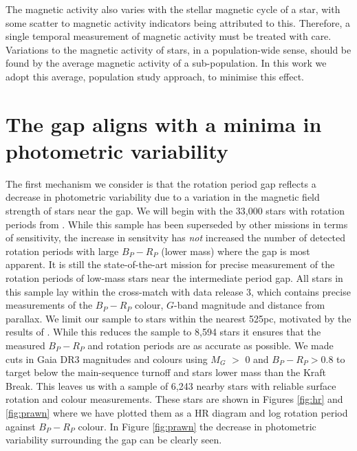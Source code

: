 The magnetic activity also varies with the stellar magnetic cycle of a star, with some scatter to magnetic activity indicators being attributed to this.
Therefore, a single temporal measurement of magnetic activity must be treated with care.
Variations to the magnetic activity of stars, in a population-wide sense, should be found by the average magnetic activity of a sub-population.
In this work we adopt this average, population study approach, to minimise this effect.

\section{The gap aligns with a minima in photometric variability}
\label{sec:minima_rper}

The first mechanism we consider is that the rotation period gap reflects a decrease in photometric variability due to a variation in the magnetic field strength of stars near the gap.
We will begin with the 33,000 stars with rotation periods from \citet{mcquillan_rotation_2014}.
While this sample has been superseded by other missions in terms of sensitivity, the increase in sensitvity has \textit{not} increased the number of detected rotation periods with large $B_P - R_P$ (lower mass) where the gap is most apparent.
It is still the state-of-the-art mission for precise measurement of the rotation periods of low-mass stars near the intermediate period gap.
All stars in this sample lay within the cross-match with \gaia data release 3, which contains precise measurements of the $B_P - R_P$ colour, $G$-band magnitude and distance from parallax.
We limit our sample to stars within the nearest 525pc, motivated by the results of \citet{davenport_rotating_2018}.
While this reduces the sample to 8,594 stars it ensures that the measured $B_P - R_P$ and rotation periods are as accurate as possible.
We made cuts in Gaia DR3 magnitudes and colours using $M_G$ $>$ 0 and $B_P - R_P > 0.8$ to target below the main-sequence turnoff and stars lower mass than the Kraft Break.
This leaves us with a sample of 6,243 nearby stars with reliable surface rotation and colour measurements.
These stars are shown in Figures \ref{fig:hr} and \ref{fig:prawn} where we have plotted them as a HR diagram and log rotation period against $B_P-R_P$ colour.
In Figure \ref{fig:prawn} the decrease in photometric variability surrounding the gap can be clearly seen.

